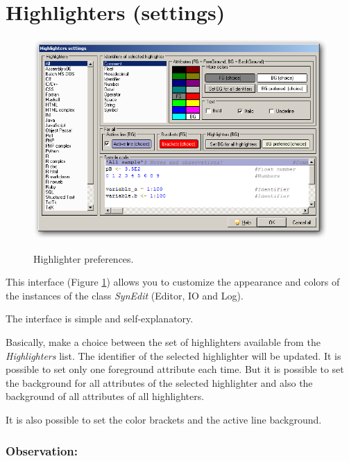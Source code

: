 
\hypertarget{working_highlighters}{}
\section{Highlighters (settings)}

\begin{figure}[h!]
  \includegraphics[scale=0.50]{./res/highlighter_settings.png}\\
  \caption{Highlighter preferences.}
  \label{fig:highlighter_preferences}
\end{figure}

This interface
(Figure \ref{fig:highlighter_preferences})
allows you to customize the appearance and colors of the
instances of the class \textit{SynEdit} (Editor, IO and Log).

The interface is simple and self-explanatory.

Basically, make a choice between the set of highlighters available
from the \textit{Highlighters} list. The identifier of the selected
highlighter will be updated. It is possible to set only one
foreground attribute each time. But it is possible to set the
background for all attributes of the selected highlighter and also
the background of all attributes of all highlighters.

It is also possible to set the color brackets and the active line
background.


\subsubsection{Observation:}

